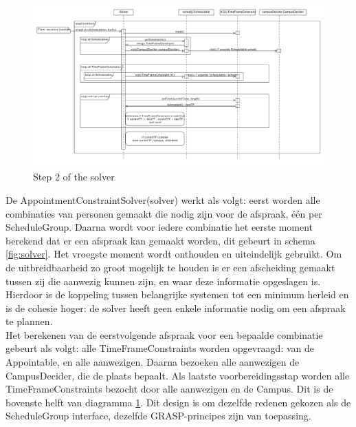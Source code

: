 \begin{figure}
\hspace{-2cm}
 \includegraphics[width=1.2\textwidth]{./exported/interaction/cartesianProduct.pdf}
 \caption{Step 2 of the solver}
 \label{fig:cartesian}
\end{figure}


De AppointmentConstraintSolver(solver) werkt als volgt: eerst worden alle combinaties van personen gemaakt die nodig zijn voor de afspraak, één per ScheduleGroup. 
Daarna wordt voor iedere combinatie het eerste moment berekend dat er een afspraak kan gemaakt worden, dit gebeurt in schema \ref{fig:solver}. 
Het vroegste moment wordt onthouden en uiteindelijk gebruikt. 
Om de uitbreidbaarheid zo groot mogelijk te houden is er een afscheiding gemaakt tussen zij die aanwezig kunnen zijn, en waar deze informatie opgeslagen is. 
Hierdoor is de koppeling tussen belangrijke systemen tot een minimum herleid en is de cohesie hoger:
de solver heeft geen enkele informatie nodig om een afspraak te plannen.\\

Het berekenen van de eerstvolgende afspraak voor een bepaalde combinatie gebeurt als volgt: alle TimeFrameConstraints worden opgevraagd: van de Appointable, en alle aanwezigen. 
Daarna bezoeken alle aanwezigen de CampusDecider, die de plaats bepaalt.
Als laatste voorbereidingsstap worden alle TimeFrameConstraints bezocht door alle aanwezigen en de Campus.
Dit is de bovenste helft van diagramma \ref{fig:cartesian}. 
Dit design is om dezelfde redenen gekozen als de ScheduleGroup interface, dezelfde GRASP-principes zijn van toepassing. \\

